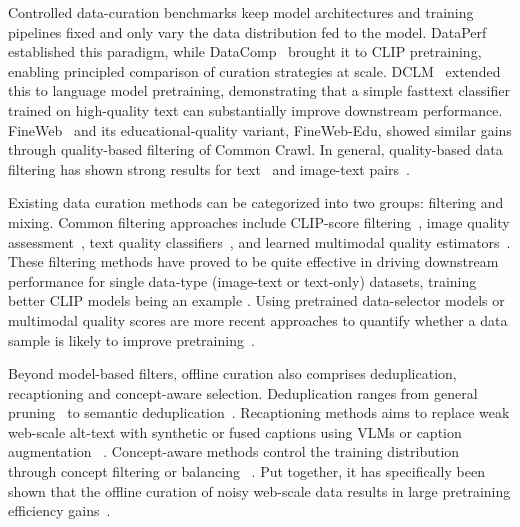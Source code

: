 Controlled data-curation benchmarks keep model architectures and training pipelines fixed and only vary the data distribution fed to the model.  DataPerf~\citep{mazumder2023dataperf} established this paradigm, while
DataComp~\citep{gadre2023datacomp} brought it to CLIP pretraining, enabling principled comparison of curation strategies at scale. DCLM~\citep{li2024datacomp} extended this to language model pretraining, demonstrating that a simple fasttext classifier trained on high-quality text can substantially improve downstream performance.
FineWeb~\citep{penedo2024fineweb} and its educational-quality variant, FineWeb-Edu, showed similar gains through quality-based filtering of Common Crawl. In general, quality-based data filtering has shown strong results for text~\citep{penedo2024fineweb,li2024datacomp} and image-text pairs~\citep{gadre2023datacomp,wang2025unifilter}.


Existing data curation methods can be categorized into two groups:   filtering and mixing. Common filtering approaches include CLIP-score filtering~\citep{hessel2021clipscore}, image quality assessment~\citep{agnolucci2024arniqa}, text quality classifiers~\citep{su2025nemotron,deshmukh2025nvidia}, and learned multimodal quality estimators~\citep{wang2025unifilter}. These filtering methods have proved to be quite effective in driving downstream performance for single data-type (image-text or text-only) datasets, training better CLIP models being an example \citep{gadre2023datacomp}. Using pretrained data-selector models or multimodal quality scores 
are more recent approaches to quantify whether a data sample is likely to improve pretraining~\citep{mahmoud2024sieve,wang2024cliploss,wang2024variance,chen2024internvl,kim2024hype}.

Beyond model-based filters, offline curation also comprises deduplication, recaptioning and concept-aware selection. Deduplication ranges from general pruning~\citep{sorscher2022beyond} to semantic deduplication~\citep{abbas2023semdedup,abbas2024effective}. Recaptioning methods aims to replace weak web-scale alt-text with synthetic or fused captions using VLMs or caption augmentation ~\citep{li2024if,yu2024capsfusion,fan2024improving,nguyen2024improving,nguyen2024multilingual,ghosh2025concept}. Concept-aware methods control the training distribution through concept filtering or balancing  ~\citep{ghosh2025concept,xu2023demystifying,oquab2023dinov2}. Put together, it has specifically been shown that the offline curation of noisy web-scale data results in large pretraining efficiency gains~\citep{jia2021scaling,changpinyo2021conceptual,gadre2023datacomp,fang2023data,vo2024automatic,maini2023t}.


